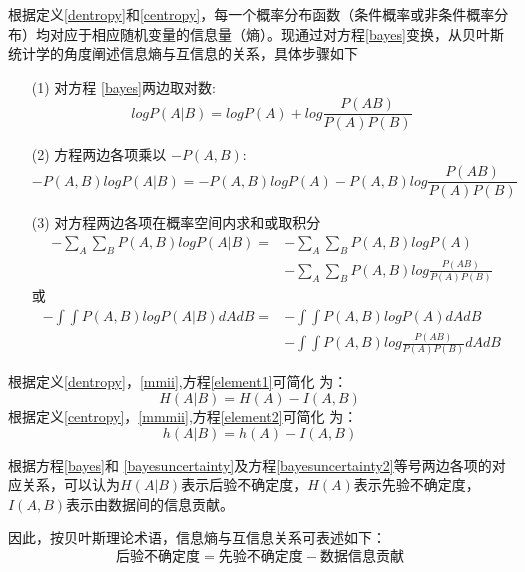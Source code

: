 根据定义\ref{dentropy}和\ref{centropy}，每一个概率分布函数（条件概率或非条件概率分布）均对应于相应随机变量的信息量（熵）。现通过对方程\ref{bayes}变换，从贝叶斯统计学的角度阐述信息熵与互信息的关系，具体步骤如下
\begin{itemize}
\item[(1)]对方程 \ref{bayes}两边取对数:
\begin{equation}
\label{log}
logP(A|B) =logP(A)+log \frac{P (AB)}{P(A)P(B)} 
\end{equation}
\item[(2)] 方程两边各项乘以 $-P(A,B)$:
\begin{equation}
\label{element}
-P(A,B)logP(A|B) =-P(A,B) logP(A)-P(A,B) log \frac{P (AB)}
{P(A)P(B)} 
\end{equation} 
\item[(3)] 对方程两边各项在概率空间内求和或取积分
\begin{equation}
\label{element1}
\begin{split}
-\sum_{A} \sum_{B} P(A,B)logP(A|B) =&-\sum_{A} \sum_{B} P
(A,B) logP(A)\\
&-\sum_{A} \sum_{B} P(A,B) log \frac{P (AB)}{P(A)P(B)} 
\end{split}
\end{equation} 
或
\begin{equation}
\label{element2}
\begin{split}
-\int\int P(A,B)logP(A|B)dAdB =&-\int \int P(A,B)logP(A)
dAdB\\
& -\int \int P(A,B)log \frac{P (AB)}{P(A)P(B)}dAdB
\end{split}
\end{equation}
\end{itemize}
根据定义\ref{dentropy}，\ref{mmii},方程\ref{element1}可简化
为：
\begin{equation}
\label{bayesuncertainty}
H(A|B) = H(A)-I(A,B)
\end{equation}
根据定义\ref{centropy}，\ref{mmmii},方程\ref{element2}可简化
为：
\begin{equation}
\label{bayesuncertainty2}
h(A|B) =h(A)-I(A,B)
\end{equation}

根据方程\ref{bayes}和 \ref{bayesuncertainty}及方程\ref{bayesuncertainty2}等号两边各项的对应关系，可以认为$H(A|B)$表示后验不确定度，$H(A)$表示先验不确定度，$I(A,B)$表示由数据间的信息贡献。

因此，按贝叶斯理论术语，信息熵与互信息关系可表述如下：
\begin{equation}
\label{ben}
\text{后验不确定度}=\text{先验不确定度}-\text{数据信息贡献}
\end{equation}

